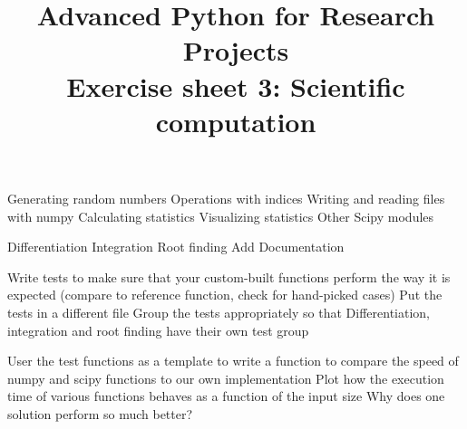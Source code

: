 \documentclass[]{erlangen-problemset}
\title{{\Large Advanced Python for Research Projects} \\[0.3cm] 
Exercise sheet 3: Scientific computation}
\begin{document}


\begin{problem}[title={Using numpy and scipy for scientific calculation}]
\noindent
\Question Generating random numbers
\Question Operations with indices
\Question Writing and reading files with numpy
\Question Calculating statistics
\Question Visualizing statistics
\Question Other Scipy modules
\end{problem}

\begin{problem}[title={Rebuilding numpy and scipy functionality ourselves}]
\noindent
\Question Differentiation
\Question Integration
\Question Root finding
\Question Add Documentation
\end{problem}


\begin{problem}[title={Adding tests to ensure correctness}]
\noindent
\Question Write tests to make sure that your custom-built functions perform the way it is expected (compare to reference function, check for hand-picked cases)
\Question Put the tests in a different file
\Question Group the tests appropriately so that Differentiation, integration and root finding have their own test group
\end{problem}

\begin{problem}[title={Measuring performance}]
    \noindent
    \Question User the test functions as a template to write a function to compare the speed of numpy and scipy functions to our own implementation
    \Question Plot how the execution time of various functions behaves as a function of the input size
    \Question Why does one solution perform so much better?
    \end{problem}
\end{document}

